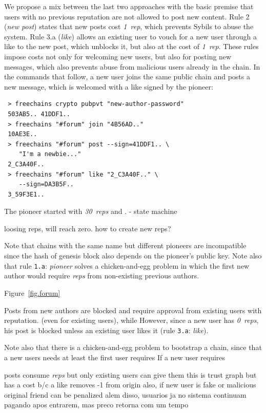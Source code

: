 \documentclass[10pt,journal,compsoc]{IEEEtran}
\newcommand{\reps}      {\emph{reps}\xspace}
\newcommand{\onerep}    {\emph{1~rep}\xspace}
\newcommand{\nreps}[1]  {\emph{#1~reps\xspace}}
\newcommand{\nrule}[2]  {rule \texttt{#1}: \emph{#2}}
\newcommand{\nRule}[2]  {Rule {#1} (\emph{#2})}
\begin{document}
We propose a mix between the last two approaches with the basic premise that
users with no previous reputation are not allowed to post new content.
\nRule{2}{new post} states that new posts cost \onerep, which prevents Sybils
to abuse the system.
\nRule{3.a}{like} allows an existing user to vouch for a new user through a
like to the new post, which unblocks it, but also at the cost of \onerep.
These rules impose costs not only for welcoming new users, but also for posting
new messages, which also prevents abuse from malicious users already in the
chain.
%
In the commands that follow, a new user joins the same public chain and posts a
new message, which is welcomed with a like signed by the pioneer:

{\footnotesize
\begin{verbatim}
 > freechains crypto pubpvt "new-author-password"
 503AB5.. 41DDF1..
 > freechains "#forum" join "4B56AD.."
 10AE3E..
 > freechains "#forum" post --sign=41DDF1.. \
    "I'm a newbie..."
 2_C3A40F..
 > freechains "#forum" like "2_C3A40F.." \
    --sign=DA3B5F..
 3_59F3E1..
\end{verbatim}
}

The pioneer started with \nreps{30} and .
- state machine

loosing reps, will reach zero. how to create new reps?

Note that chains with the same name but different pioneers are incompatible
since the hash of genesis block also depends on the pioneer's public key.
Note also that \nrule{1.a}{pioneer} solves a chicken-and-egg problem in which
the first new author would require \reps from non-existing previous authors.

Figure~\ref{fig.forum}

Posts from new authors are blocked and require approval from existing users
with reputation.
 (even for existing
users), while 
However, since a new user has \nreps{0}, his post is blocked unless an existing
user likes it (\nrule{3.a}{like}).

Note also that there is a chicken-and-egg problem to bootstrap a chain, since
that a new users needs at least the first user requires 
If a new user requires


posts consume \reps
but only existing users can give them
this is trust graph but has a cost b/c a like removes -1 from origin
also, if new user is fake or malicious original friend can be penalized
alem disso, usuarios ja no sistema continuam pagando apos entrarem, mas preco retorna com um tempo
\end{document}
